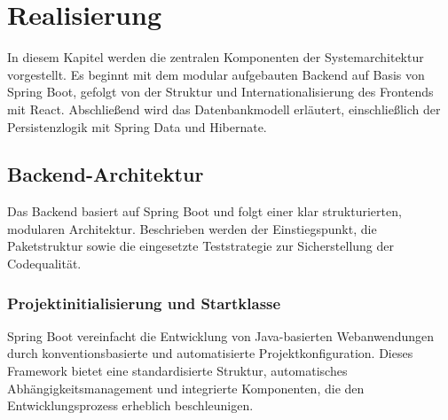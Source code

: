 \chapter{Realisierung}

In diesem Kapitel werden die zentralen Komponenten der Systemarchitektur vorgestellt. Es beginnt mit dem modular aufgebauten Backend auf Basis von Spring Boot, gefolgt von der Struktur und Internationalisierung des Frontends mit React. Abschließend wird das Datenbankmodell erläutert, einschließlich der Persistenzlogik mit Spring Data und Hibernate.

\section{Backend-Architektur}
 
Das Backend basiert auf Spring Boot und folgt einer klar strukturierten, modularen Architektur. Beschrieben werden der Einstiegspunkt, die Paketstruktur sowie die eingesetzte Teststrategie zur Sicherstellung der Codequalität.

\subsection{Projektinitialisierung und Startklasse}

Spring Boot vereinfacht die Entwicklung von Java-basierten Webanwendungen durch konventionsbasierte und automatisierte Projektkonfiguration. Dieses Framework bietet eine standardisierte Struktur, automatisches Abhängigkeitsmanagement und integrierte Komponenten, die den Entwicklungsprozess erheblich beschleunigen.

